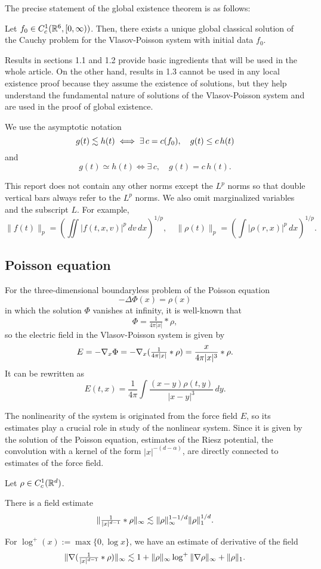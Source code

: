 \documentclass[11pt]{amsart}
\begin{document}
The precise statement of the global existence theorem is as follows:
\begin{thm}
Let $f_0\in C_c^1(\mathbb{R}^6,[0,\infty))$.
Then, there exists a unique global classical solution of the Cauchy problem for the Vlasov-Poisson system with initial data $f_0$.
\end{thm}

Results in sections 1.1 and 1.2 provide basic ingredients that will be used in the whole article.
On the other hand, results in 1.3 cannot be used in any local existence proof because they assume the existence of solutions, but they help understand the fundamental nature of solutions of the Vlasov-Poisson system and are used in the proof of global existence.

\begin{notn*}
We use the asymptotic notation
\[g(t)\lesssim h(t)\iff\exists\,c=c(f_0),\quad g(t)\le c\,h(t)\]
and
\[g(t)\simeq h(t)\iff\exists\,c,\quad g(t)=c\,h(t).\]

This report does not contain any other norms except the $L^p$ norms so that double vertical bars always refer to the $L^p$ norms.
We also omit marginalized variables and the subscript $L$.
For example,
\[\|f(t)\|_p=(\iint|f(t,x,v)|^p\,dv\,dx)^{1/p},\quad\|\rho(t)\|_p=(\int|\rho(r,x)|^p\,dx)^{1/p}.\]
\end{notn*}



\subsection{Poisson equation}
For the three-dimensional boundaryless problem of the Poisson equation
\[-\Delta\Phi(x)=\rho(x)\]
in which the solution $\Phi$ vanishes at infinity, it is well-known that
\[\Phi=\tfrac1{4\pi|x|}*\rho,\]
so the electric field in the Vlasov-Poisson system is given by
\[E=-\nabla_x\Phi=-\nabla_x(\tfrac1{4\pi|x|}*\rho)=\frac{x}{4\pi|x|^3}*\rho.\]
It can be rewritten as
\[E(t,x)=\frac1{4\pi}\int\frac{(x-y)\rho(t,y)}{|x-y|^3}\,dy.\]

The nonlinearity of the system is originated from the force field $E$, so its estimates play a crucial role in study of the nonlinear system.
Since it is given by the solution of the Poisson equation, estimates of the Riesz potential, the convolution with a kernel of the form $|x|^{-(d-\alpha)}$, are directly connected to estimates of the force field.

\begin{lem}
Let $\rho\in C_c^1(\mathbb{R}^d)$.
\begin{ol}
\item
There is a field estimate
\[\|\tfrac1{|x|^{d-1}}*\rho\|_\infty\lesssim\|\rho\|_\infty^{1-1/d}\|\rho\|_1^{1/d}.\]
\item
For $\log^+(x):=\max\{0,\log x\}$, we have an estimate of derivative of the field
\[\|\nabla(\tfrac1{|x|^{d-1}}*\rho)\|_\infty\lesssim1+\|\rho\|_\infty\log^+\|\nabla\rho\|_\infty+\|\rho\|_1.\]
\end{ol}
\end{lem}
\end{document}
